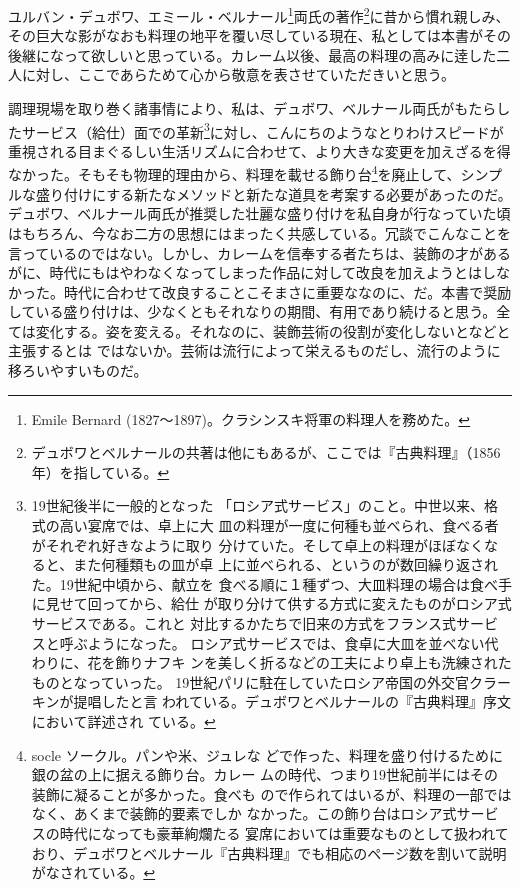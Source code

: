 ユルバン・デュボワ、エミール・ベルナール\footnote{Emile Bernard
  (1827〜1897)。クラシンスキ将軍の料理人を務めた。}両氏の著作\footnote{デュボワとベルナールの共著は他にもあるが、ここでは『古典料理』（1856年）を指している。}に昔から慣れ親しみ、その巨大な影がなおも料理の地平を覆い尽している現在、私としては本書がその後継になって欲しいと思っている。カレーム以後、最高の料理の高みに逹した二人に対し、ここであらためて心から敬意を表させていただきいと思う。

調理現場を取り巻く諸事情により、私は、デュボワ、ベルナール両氏がもたらしたサービス（給仕）面での革新\footnote{\protect\hypertarget{service-russe}{19世紀後半に一般的となった
  「ロシア式サービス」のこと。中世以来、格式の高い宴席では、卓上に大
  皿の料理が一度に何種も並べられ、食べる者がそれぞれ好きなように取り
  分けていた。そして卓上の料理がほぼなくなると、また何種類もの皿が卓
  上に並べられる、というのが数回繰り返された。19世紀中頃から、献立を
  食べる順に１種ずつ、大皿料理の場合は食べ手に見せて回ってから、給仕
  が取り分けて供する方式に変えたものがロシア式サービスである。これと
  対比するかたちで旧来の方式をフランス式サービスと呼ぶようになった。
  ロシア式サービスでは、食卓に大皿を並べない代わりに、花を飾りナフキ
  ンを美しく折るなどの工夫により卓上も洗練されたものとなっていった。
  19世紀パリに駐在していたロシア帝国の外交官クラーキンが提唱したと言
  われている。デュボワとベルナールの『古典料理』序文において詳述され
  ている。}}に対し、こんにちのようなとりわけスピードが重視される目まぐるしい生活リズムに合わせて、より大きな変更を加えざるを得なかった。そもそも物理的理由から、料理を載せる飾り台\footnote{\protect\hypertarget{socle}{socle ソークル。パンや米、ジュレな
  どで作った、料理を盛り付けるために銀の盆の上に据える飾り台。カレー
  ムの時代、つまり19世紀前半にはその装飾に凝ることが多かった。食べも
  ので作られてはいるが、料理の一部ではなく、あくまで装飾的要素でしか
  なかった。この飾り台はロシア式サービスの時代になっても豪華絢爛たる
  宴席においては重要なものとして扱われており、デュボワとベ}ルナール『古典料理』でも相応のページ数を割いて説明がなされている。}を廃止して、シンプルな盛り付けにする新たなメソッドと新たな道具を考案する必要があったのだ。デュボワ、ベルナール両氏が推奨した壮麗な盛り付けを私自身が行なっていた頃はもちろん、今なお二方の思想にはまったく共感している。冗談でこんなことを言っているのではない。しかし、カレームを信奉する者たちは、装飾の才があるがに、時代にもはやわなくなってしまった作品に対して改良を加えようとはしなかった。時代に合わせて改良することこそまさに重要ななのに、だ。本書で奨励している盛り付けは、少なくともそれなりの期間、有用であり続けると思う。全ては変化する。姿を変える。それなのに、装飾芸術の役割が変化しないとなどと主張するとは
ではないか。芸術は流行によって栄えるものだし、流行のように移ろいやすいものだ。

